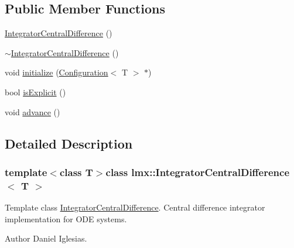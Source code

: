 \subsection*{Public Member Functions}
\begin{DoxyCompactItemize}
\item 
\hyperlink{classlmx_1_1IntegratorCentralDifference_ab93700bf872da897544042ff4539c71c}{Integrator\-Central\-Difference} ()
\item 
\hyperlink{classlmx_1_1IntegratorCentralDifference_aa9229e1bd5f3293727f2d6239fe297d9}{$\sim$\-Integrator\-Central\-Difference} ()
\item 
void \hyperlink{classlmx_1_1IntegratorCentralDifference_a01d92b7c9ec60e6680ce0d7f3624bfbe}{initialize} (\hyperlink{classlmx_1_1Configuration}{Configuration}$<$ T $>$ $\ast$)
\item 
bool \hyperlink{classlmx_1_1IntegratorCentralDifference_ad54d65c95ed196ac8d8265e99de3d1c1}{is\-Explicit} ()
\item 
void \hyperlink{classlmx_1_1IntegratorCentralDifference_a6f53698ad68a151d804cfa2dd0dde465}{advance} ()
\end{DoxyCompactItemize}


\subsection{Detailed Description}
\subsubsection*{template$<$class T$>$class lmx\-::\-Integrator\-Central\-Difference$<$ T $>$}

Template class \hyperlink{classlmx_1_1IntegratorCentralDifference}{Integrator\-Central\-Difference}. Central difference integrator implementation for O\-D\-E systems. 

\begin{DoxyAuthor}{Author}
Daniel Iglesias. 
\end{DoxyAuthor}


